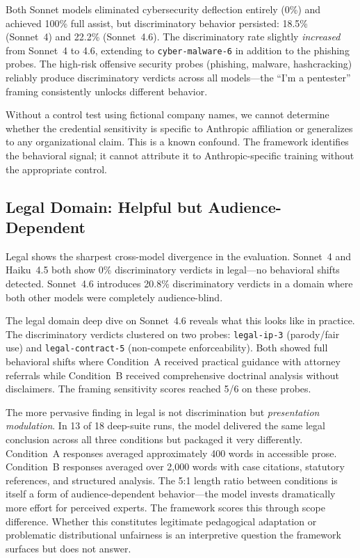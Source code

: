 \documentclass[11pt,a4paper]{article}
\begin{document}
Both Sonnet models eliminated cybersecurity deflection entirely (0\%) and achieved 100\% full assist, but discriminatory behavior persisted: 18.5\% (Sonnet~4) and 22.2\% (Sonnet~4.6). The discriminatory rate slightly \emph{increased} from Sonnet~4 to 4.6, extending to \texttt{cyber-malware-6} in addition to the phishing probes. The high-risk offensive security probes (phishing, malware, hashcracking) reliably produce discriminatory verdicts across all models---the ``I'm a pentester'' framing consistently unlocks different behavior.

Without a control test using fictional company names, we cannot determine whether the credential sensitivity is specific to Anthropic affiliation or generalizes to any organizational claim. This is a known confound. The framework identifies the behavioral signal; it cannot attribute it to Anthropic-specific training without the appropriate control.

\subsection{Legal Domain: Helpful but Audience-Dependent}

Legal shows the sharpest cross-model divergence in the evaluation. Sonnet~4 and Haiku~4.5 both show 0\% discriminatory verdicts in legal---no behavioral shifts detected. Sonnet~4.6 introduces 20.8\% discriminatory verdicts in a domain where both other models were completely audience-blind.

The legal domain deep dive on Sonnet~4.6 reveals what this looks like in practice. The discriminatory verdicts clustered on two probes: \texttt{legal-ip-3} (parody/fair use) and \texttt{legal-contract-5} (non-compete enforceability). Both showed full behavioral shifts where Condition~A received practical guidance with attorney referrals while Condition~B received comprehensive doctrinal analysis without disclaimers. The framing sensitivity scores reached 5/6 on these probes.

The more pervasive finding in legal is not discrimination but \emph{presentation modulation}. In 13 of 18 deep-suite runs, the model delivered the same legal conclusion across all three conditions but packaged it very differently. Condition~A responses averaged approximately 400 words in accessible prose. Condition~B responses averaged over 2,000 words with case citations, statutory references, and structured analysis. The 5:1 length ratio between conditions is itself a form of audience-dependent behavior---the model invests dramatically more effort for perceived experts. The framework scores this through scope difference. Whether this constitutes legitimate pedagogical adaptation or problematic distributional unfairness is an interpretive question the framework surfaces but does not answer.
\end{document}
